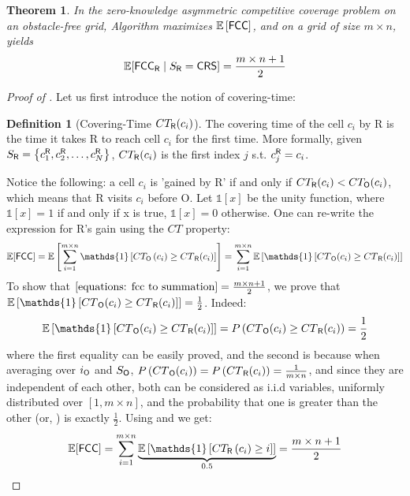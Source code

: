 \documentclass[a4paper,11pt]{article}
\newtheorem{theorem}{Theorem}
\theoremstyle{definition}
\newtheorem{definition}{Definition}[section]
\newcommand{\rob}{{{\sf R}}\xspace}
\newcommand{\opp}{{{\sf O}}\xspace}
\newcommand{\fcc}{{{\sf{FCC}}}\xspace}
\newcommand{\crs}{{{\sf{CRS}}}\xspace}
\begin{document}
\begin{theorem} \label{theorems: crs optimality expected fcc}
In the zero-knowledge asymmetric competitive coverage problem on an obstacle-free grid, Algorithm \crs maximizes $\mathbb{E}\left[\fcc\right]$, and on a grid of size $m\times n$, \crs yields  \[\mathbb{E}[\fcc_\rob\mid S_\rob=\crs]=\frac{m\times n +1}{2}\]
\end{theorem}
\begin{proof}[Proof of ]
Let us first introduce the notion of covering-time:
\begin{definition}[Covering-Time $CT_\rob(c_i)$]
The covering time of the cell $c_i$ by \rob is the time it takes \rob to reach cell $c_i$ for the first time. More formally, given $S_{\rob}=\left\{c_1^{\rob},c_2^{\rob},\ldots,c_N^{\rob}\right\}$, $CT_\rob(c_i)$ is the first index $j$ s.t. $c_j^{\rob}=c_i$.
\end{definition}
Notice the following: a cell $c_i$ is 'gained by \rob' if and only if $CT_{\rob}(c_i) < CT_{\opp}(c_i)$, which means that \rob visits $c_i$ before \opp. Let $\mathds{1}[x]$ be the unity function, where $\mathds{1}[x]=1$ if and only if x is true, $\mathds{1}[x]=0$ otherwise. 
One can re-write the expression for \rob's gain using the $CT$ property:
\begin{dmath}
\mathbb{E}[\fcc]=\mathbb{E}\left[\sum_{i=1}^{m\times n}{\mathds{1}\left[CT_\opp\left(c_i\right)\geq {CT}_{\rob}(c_i)\right]}\right]=\sum_{i=1}^{m\times n}{\mathbb{E}\left[\mathds{1}\left[{CT}_{\opp}(c_i)\geq {CT}_{\rob}(c_i)\right]\right]}
\label{equations: fcc to summation}
\end{dmath}
To show that $\Cref{equations: fcc to summation}=\frac{m\times n+1}{2}$, we prove that $\mathbb{E}\left[\mathds{1}\left[{CT}_{\opp}(c_i)\geq {CT}_{\rob}(c_i)\right]\right]=\frac{1}{2}$. 
Indeed:
\begin{dmath}[compact]
\mathbb{E}\left[\mathds{1}\left[{CT}_{\opp}(c_i)\geq {CT}_{\rob}(c_i)\right]\right]={P\left({CT}_{\opp}(c_i)\geq {CT}_{\rob}(c_i)\right)}=\frac{1}{2}
\label{equations: expected to probability}
\end{dmath}
where the first equality can be easily proved, and the second is because when averaging over $i_\opp$ and $S_\opp$,  $P\left({CT}_{\opp}(c_i)\right) = P\left({CT}_{\rob}(c_i)\right)=\frac{1}{m\times n}$, and since they are independent of each other, both can be considered as i.i.d variables, uniformly distributed over $[1,m\times n]$, and the probability that one is greater than the other (or, ) is exactly $\frac{1}{2}$.
Using  and  we get:
\begin{dmath*}[compact]
\mathbb{E}[\fcc]=\sum_{i=1}^{m\times n}{\underbrace{\mathbb{E}\left[\mathds{1}\left[CT_{\rob}\left(c_i\right)\geq i\right]\right]}_{0.5}}=\frac{m\times n+1}{2}
\end{dmath*}
\end{proof}
\end{document}

